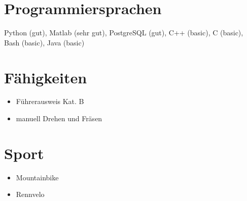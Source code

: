 \documentclass[a4paper,12pt]{article}
\begin{document}
\section*{Programmiersprachen}
Python (gut), Matlab (sehr gut), PostgreSQL (gut), C++ (basic), C (basic), Bash (basic), Java (basic)

\section*{Fähigkeiten}
\begin{itemize}
\item Führerausweis Kat. B
\item manuell Drehen und Fräsen

\end{itemize}

\section*{Sport}
\begin{itemize}
    \item Mountainbike
    \item Rennvelo
\end{itemize}
\end{document}
